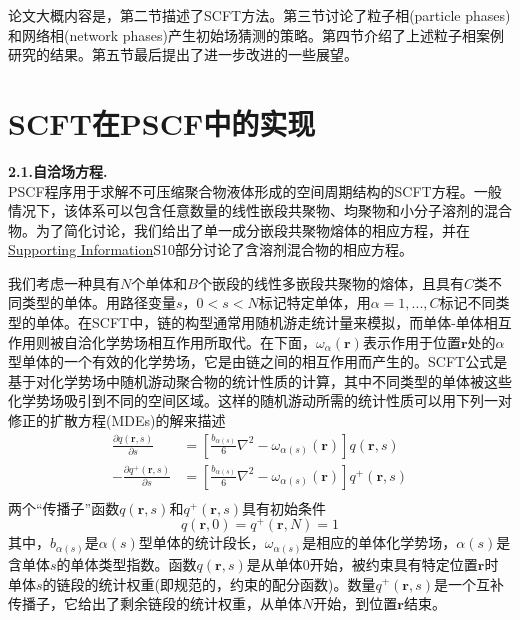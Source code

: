\documentclass[12pt,a4paper]{article}
\begin{document}
论文大概内容是，第二节描述了SCFT方法。第三节讨论了粒子相(particle phases)和网络相(network phases)产生初始场猜测的策略。第四节介绍了上述粒子相案例研究的结果。第五节最后提出了进一步改进的一些展望。

\section{SCFT在PSCF中的实现}
\textbf{2.1.自洽场方程.}\\
PSCF程序用于求解不可压缩聚合物液体形成的空间周期结构的SCFT方程。一般情况下，该体系可以包含任意数量的线性嵌段共聚物、均聚物和小分子溶剂的混合物。为了简化讨论，我们给出了单一成分嵌段共聚物熔体的相应方程，并在\href{http://pubs.acs.org/doi/suppl/10.1021/acs.macromol.6b00107/suppl_file/ma6b00107_si_001.pdf}{Supporting Information}S10部分讨论了含溶剂混合物的相应方程。

我们考虑一种具有$N$个单体和$B$个嵌段的线性多嵌段共聚物的熔体，且具有$C$类不同类型的单体。用路径变量$s$，$0<s<N$标记特定单体，用$\alpha=1,...,C$标记不同类型的单体。在SCFT中，链的构型通常用随机游走统计量来模拟，而单体-单体相互作用则被自洽化学势场相互作用所取代。在下面，$\omega_{\alpha}(\mathbf{r})$表示作用于位置$\mathbf{r}$处的$\alpha$型单体的一个有效的化学势场，它是由链之间的相互作用而产生的。SCFT公式是基于对化学势场中随机游动聚合物的统计性质的计算，其中不同类型的单体被这些化学势场吸引到不同的空间区域。这样的随机游动所需的统计性质可以用下列一对修正的扩散方程(MDEs)的解来描述
\begin{equation}\label{1}
\begin{aligned}
\frac{\partial q(\mathbf{r},s)}{\partial s} & = \left[ \frac{b_{\alpha (s)}}{6}\nabla ^2 - \omega_{\alpha (s)}(\mathbf{r}) \right]q(\mathbf{r},s)\\
-\frac{\partial q^{+}(\mathbf{r},s)}{\partial s} & = \left[ \frac{b_{\alpha (s)}}{6}\nabla ^2 - \omega_{\alpha (s)}(\mathbf{r}) \right]q^{+}(\mathbf{r},s)\\
\end{aligned}
\end{equation}
两个“传播子”函数$q(\mathbf{r},s)$和$q^{+}(\mathbf{r},s)$具有初始条件
\begin{equation}\label{2}
q(\mathbf{r},0)=q^{+}(\mathbf{r},N)=1
\end{equation}
其中，$b_{\alpha (s)}$是$\alpha (s)$型单体的统计段长，$\omega_{\alpha (s)}$是相应的单体化学势场，$\alpha (s)$是含单体$s$的单体类型指数。函数$q(\mathbf{r},s)$是从单体$0$开始，被约束具有特定位置$\mathbf{r}$时单体$s$的链段的统计权重(即规范的，约束的配分函数)。数量$q^{+}(\mathbf{r},s)$是一个互补传播子，它给出了剩余链段的统计权重，从单体$N$开始，到位置$\mathbf{r}$结束。
\end{document}
